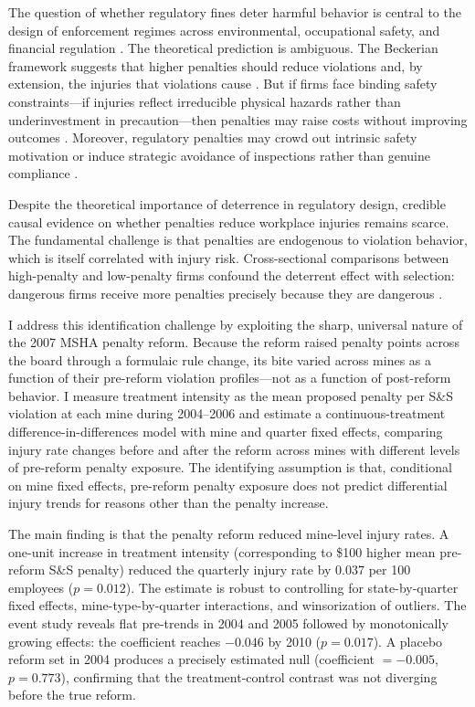 \documentclass[12pt]{article}
\begin{document}
The question of whether regulatory fines deter harmful behavior is central to the design of enforcement regimes across environmental, occupational safety, and financial regulation \citep{becker1968crime, polinsky2000public}. The theoretical prediction is ambiguous. The Beckerian framework suggests that higher penalties should reduce violations and, by extension, the injuries that violations cause \citep{becker1968crime}. But if firms face binding safety constraints---if injuries reflect irreducible physical hazards rather than underinvestment in precaution---then penalties may raise costs without improving outcomes \citep{viscusi1979impact}. Moreover, regulatory penalties may crowd out intrinsic safety motivation or induce strategic avoidance of inspections rather than genuine compliance \citep{gneezy2000fine}.

Despite the theoretical importance of deterrence in regulatory design, credible causal evidence on whether penalties reduce workplace injuries remains scarce. The fundamental challenge is that penalties are endogenous to violation behavior, which is itself correlated with injury risk. Cross-sectional comparisons between high-penalty and low-penalty firms confound the deterrent effect with selection: dangerous firms receive more penalties precisely because they are dangerous \citep{gray2005effectiveness}.

I address this identification challenge by exploiting the sharp, universal nature of the 2007 MSHA penalty reform. Because the reform raised penalty points across the board through a formulaic rule change, its bite varied across mines as a function of their pre-reform violation profiles---not as a function of post-reform behavior. I measure treatment intensity as the mean proposed penalty per S\&S violation at each mine during 2004--2006 and estimate a continuous-treatment difference-in-differences model with mine and quarter fixed effects, comparing injury rate changes before and after the reform across mines with different levels of pre-reform penalty exposure. The identifying assumption is that, conditional on mine fixed effects, pre-reform penalty exposure does not predict differential injury trends for reasons other than the penalty increase.

The main finding is that the penalty reform reduced mine-level injury rates. A one-unit increase in treatment intensity (corresponding to \$100 higher mean pre-reform S\&S penalty) reduced the quarterly injury rate by 0.037 per 100 employees ($p = 0.012$). The estimate is robust to controlling for state-by-quarter fixed effects, mine-type-by-quarter interactions, and winsorization of outliers. The event study reveals flat pre-trends in 2004 and 2005 followed by monotonically growing effects: the coefficient reaches $-0.046$ by 2010 ($p = 0.017$). A placebo reform set in 2004 produces a precisely estimated null (coefficient $= -0.005$, $p = 0.773$), confirming that the treatment-control contrast was not diverging before the true reform.
\end{document}
